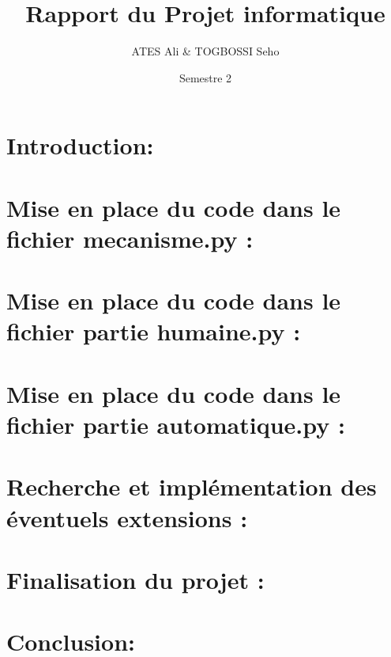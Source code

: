 \documentclass{article}
\author{ATES Ali \& TOGBOSSI Seho}
\date{Semestre 2}
\title{Rapport du Projet informatique}
\begin{document}
\maketitle
\tableofcontents
	\section*{Introduction:}
	\section{Mise en place du code dans le fichier mecanisme.py :}
	\section{Mise en place du code dans le fichier partie humaine.py :}
	\section{Mise en place du code dans le fichier partie automatique.py :}
	\section{Recherche et implémentation des éventuels extensions :}
	\section{Finalisation du projet :}
	\section*{Conclusion:}
\end{document}
